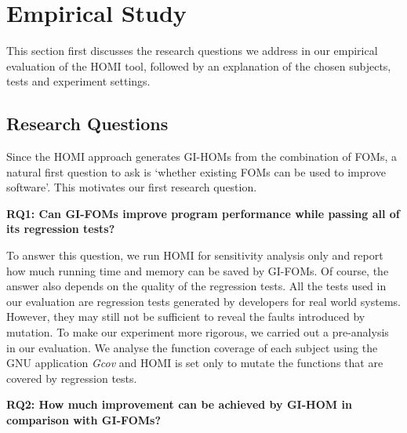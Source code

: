 \documentclass[oribibl]{llncs}
\begin{document}
\section{Empirical Study}
\label{sec_exp}

This section first discusses the research questions we address in our empirical evaluation of the HOMI tool, followed by an explanation of the chosen subjects, tests and experiment settings.




\subsection{Research Questions}
\label{sec_rq}


Since the HOMI approach generates GI-HOMs from the combination of FOMs, a natural first question to ask is `whether existing FOMs can be used to improve software'.  This motivates our first research question. 

\vspace{2mm}
\noindent\textbf{RQ1: Can GI-FOMs improve program performance while passing all of its regression tests?}
\vspace{2mm}

To answer this question, we run HOMI for sensitivity analysis only and report how much running time and memory can be saved by GI-FOMs. Of course, the answer also depends on the quality of the regression tests. All the tests used in our evaluation are regression tests generated by developers for real world systems. However, they may still not be sufficient to reveal the faults introduced by mutation. To make our experiment more rigorous, we carried out a pre-analysis in our evaluation. We analyse the function coverage of each subject using the GNU application \emph{Gcov} and HOMI is set only to mutate the functions that are covered by regression tests. 


\vspace{2mm}
\noindent\textbf{RQ2: How much improvement can be achieved by GI-HOM in comparison with GI-FOMs?}
\vspace{2mm}
\end{document}
